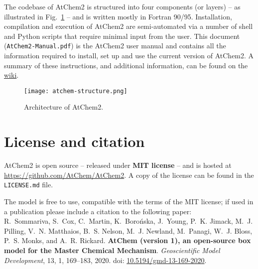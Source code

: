 The codebase of AtChem2 is structured into four components (or layers)
-- as illustrated in Fig.~\ref{fig:atchem-arch} -- and is written
mostly in Fortran 90/95.  Installation, compilation and execution of
AtChem2 are semi-automated via a number of shell and Python scripts
that require minimal input from the user. This document
(\texttt{AtChem2-Manual.pdf}) is the AtChem2 user manual and contains
all the information required to install, set up and use the current
version of AtChem2. A summary of these instructions, and additional
information, can be found on the
\href{https://github.com/AtChem/AtChem2/wiki/}{wiki}.

\begin{figure}[htb]
  \centering
  \texttt{[image: atchem-structure.png]}
  \caption{Architecture of AtChem2.}
  \label{fig:atchem-arch}
\end{figure}

\section{License and citation} \label{sec:license-citation}

AtChem2 is open source -- released under \textbf{MIT license} -- and is hosted
at \href{https://github.com/AtChem/AtChem2}{https://github.com/AtChem/AtChem2}.
A copy of the license can be found in the \texttt{LICENSE.md} file.

The model is free to use, compatible with the terms of the MIT
license; if used in a publication please include a citation to
the following paper:\\

R.~Sommariva, S.~Cox, C.~Martin, K.~Boro{\'n}ska, J.~Young, P.~K. Jimack,
M.~J. Pilling, V.~N. Matthaios, B.~S. Nelson, M.~J. Newland, M.~Panagi,
W.~J. Bloss, P.~S. Monks, and A.~R. Rickard.
\textbf{AtChem (version 1), an open-source box model for the Master Chemical Mechanism}.
\textit{Geoscientific Model Development}, 13, 1, 169--183, 2020.
doi: \href{https://doi.org/10.5194/gmd-13-169-2020}{10.5194/gmd-13-169-2020}.
